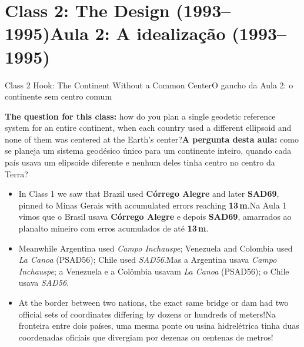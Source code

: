 \documentclass[aspectratio=169,11pt]{beamer}
\newcommand{\tr}[2]{\ifEN#2\else#1\fi}
\newcommand{\bnum}[1]{\ifmmode\textcolor{mTeal}{\mathbf{#1}}\else\textbf{\textcolor{mTeal}{#1}}\fi}
\begin{document}
\section{\tr{Aula 2: A idealização (1993--1995)}{Class 2: The Design (1993--1995)}}

\begin{frame}{\tr{O gancho da Aula 2: o continente sem centro comum}{Class 2 Hook: The Continent Without a Common Center}}
  \begin{ideia}
    \tr{\textbf{A pergunta desta aula:} como se planeja um sistema geodésico único para um
    continente inteiro, quando cada país usava um elipsoide diferente e nenhum deles tinha centro
    no centro da Terra?}{\textbf{The question for this class:} how do you plan a single geodetic
    reference system for an entire continent, when each country used a different ellipsoid and none
    of them was centered at the Earth's center?}
  \end{ideia}
  \vspace{0.2cm}
  \begin{itemize}
    \setlength{\itemsep}{6pt}
    \item \tr{Na Aula 1 vimos que o Brasil usava \textbf{Córrego Alegre} e depois \textbf{SAD69},
          amarrados ao planalto mineiro com erros acumulados de até \bnum{\num{13}\,m}.}{In Class 1
          we saw that Brazil used \textbf{Córrego Alegre} and later \textbf{SAD69}, pinned to Minas
          Gerais with accumulated errors reaching \bnum{\num{13}\,m}.}
    \item \tr{Mas a Argentina usava \emph{Campo Inchauspe}; a Venezuela e a Colômbia usavam
          \emph{La Canoa} (PSAD56); o Chile usava \emph{SAD56}.}{Meanwhile Argentina used
          \emph{Campo Inchauspe}; Venezuela and Colombia used \emph{La Canoa} (PSAD56); Chile used
          \emph{SAD56}.}
    \item \tr{Na fronteira entre dois países, uma mesma ponte ou usina hidrelétrica tinha duas
          coordenadas oficiais que divergiam por dezenas ou centenas de metros!}{At the border
          between two nations, the exact same bridge or dam had two official sets of coordinates
          differing by dozens or hundreds of meters!}
  \end{itemize}
\end{frame}
\end{document}
